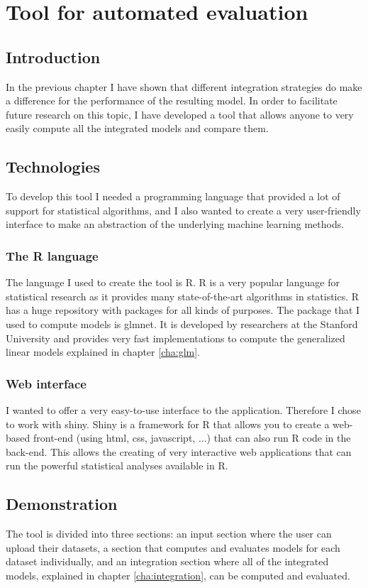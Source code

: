 \chapter{Tool for automated evaluation}
\label{cha:tool}

\section{Introduction}
\label{sec:tool-introduction}
In the previous chapter I have shown that different integration strategies do make a difference for the performance of the resulting model. In order to facilitate future research on this topic, I have developed a tool that allows anyone to very easily compute all the integrated models and compare them.
\section{Technologies}
\label{sec:tool-technologies}
To develop this tool I needed a programming language that provided a lot of support for statistical algorithms, and I also wanted to create a very user-friendly interface to make an abstraction of the underlying machine learning methods.
\subsection{The R language}
The language I used to create the tool is R. R is a very popular language for statistical research as it provides many state-of-the-art algorithms in statistics. R has a huge repository with packages for all kinds of purposes. The package that I used to compute models is glmnet\cite{glmnetvignette}. It is developed by researchers at the Stanford University and provides very fast implementations to compute the generalized linear models explained in chapter \ref{cha:glm}. 
\subsection{Web interface}
I wanted to offer a very easy-to-use interface to the application. Therefore I chose to work with shiny\cite{shiny}. Shiny is a framework for R that allows you to create a web-based front-end (using html, css, javascript, ...) that can also run R code in the back-end. This allows the creating of very interactive web applications that can run the powerful statistical analyses available in R.
\section{Demonstration}
\label{sec:tool-demonstration}
The tool is divided into three sections: an input section where the user can upload their datasets, a section that computes and evaluates models for each dataset individually, and an integration section where all of the integrated models, explained in chapter \ref{cha:integration}, can be computed and evaluated.
